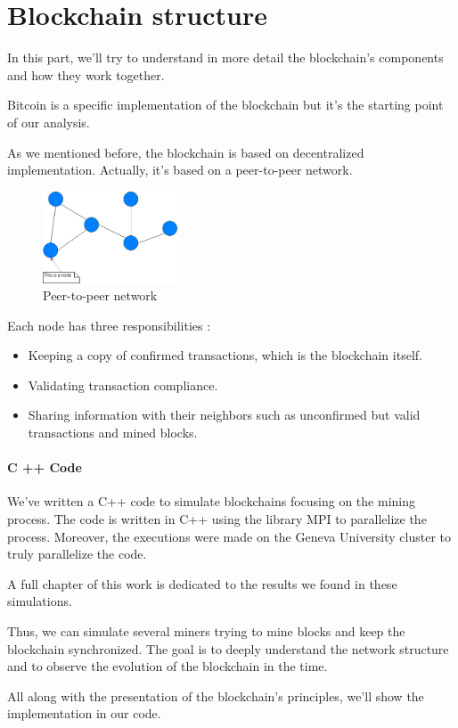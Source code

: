 \section{Blockchain structure}

In this part, we'll try to understand in more detail the blockchain's components and how they work together.

Bitcoin is a specific implementation of the blockchain but it's the starting point of our analysis. \newline

As we mentioned before, the blockchain is based on decentralized implementation. Actually, it's based on a peer-to-peer network.

\begin{figure}[ht]
\centering
\includegraphics[width=4cm]{Figures/network}
\caption{Peer-to-peer network}
\end{figure}
\medskip

Each node has three responsibilities :

\begin{itemize}
  \item Keeping a copy of confirmed transactions, which is the blockchain itself.
  \item Validating transaction compliance.
  \item Sharing information with their neighbors such as unconfirmed but valid transactions and mined blocks.
\end{itemize}

\clearpage

\begin{aside}

\paragraph{C ++ Code}

We've written a C++ code to simulate blockchains focusing on the mining process. The code is written in C++ using the library MPI to parallelize the process. Moreover, the executions were made on the Geneva University cluster to truly parallelize the code.

A full chapter of this work is dedicated to the results we found in these simulations. \newline

Thus, we can simulate several miners trying to mine blocks and keep the blockchain synchronized. The goal is to deeply understand the network structure and to observe the evolution of the blockchain in the time. \newline

All along with the presentation of the blockchain's principles, we'll show the implementation in our code.

\end{aside}
\medskip

